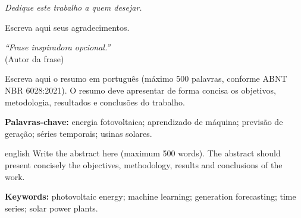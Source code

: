 \documentclass[
  12pt,
  openright,
  twoside,
  a4paper,
  brazil,
]{abntex2}
\begin{document}
\begin{dedicatoria}
  \vspace*{\fill}
  \begin{flushright}
    \textit{Dedique este trabalho a quem desejar.}
  \end{flushright}
\end{dedicatoria}

\begin{agradecimentos}
  Escreva aqui seus agradecimentos.
\end{agradecimentos}

\begin{epigrafe}
  \vspace*{\fill}
  \begin{flushright}
    \textit{``Frase inspiradora opcional.''}\\
    (Autor da frase)
  \end{flushright}
\end{epigrafe}

\setlength{\absparsep}{18pt}
\begin{resumo}
  Escreva aqui o resumo em português (máximo 500 palavras, conforme ABNT NBR 6028:2021).
  O resumo deve apresentar de forma concisa os objetivos, metodologia, resultados e
  conclusões do trabalho.

  \noindent\textbf{Palavras-chave:} energia fotovoltaica; aprendizado de máquina;
  previsão de geração; séries temporais; usinas solares.
\end{resumo}

\begin{resumo}[Abstract]
  \begin{otherlanguage*}{english}
    Write the abstract here (maximum 500 words).
    The abstract should present concisely the objectives, methodology, results and
    conclusions of the work.

    \noindent\textbf{Keywords:} photovoltaic energy; machine learning;
    generation forecasting; time series; solar power plants.
  \end{otherlanguage*}
\end{resumo}

\listoffigures*
\cleardoublepage
\end{document}
